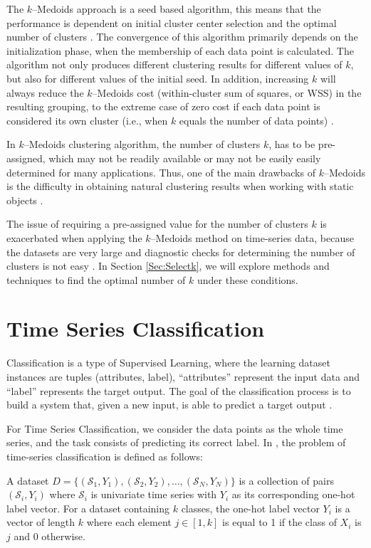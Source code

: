 The $k$--Medoids approach is a seed based algorithm, this means that the performance is dependent on initial cluster center selection and the optimal number of clusters \cite{Chowdhury2019}. The convergence of this algorithm primarily depends on the initialization phase, when the membership of each data point is calculated. The algorithm not only produces different clustering results for different values of $k$, but also for different values of the initial seed. In addition, increasing $k$ will always reduce the $k$--Medoids cost (within-cluster sum of squares, or WSS) in the resulting grouping, to the extreme case of zero cost if each data point is considered its own cluster (i.e., when $k$ equals the number of data points) \cite{HastieTF2009}. 

In $k$--Medoids clustering algorithm, the number of clusters $k$, has to be pre-assigned, which may not be readily available or may not be easily easily determined for many applications. Thus, one of the main drawbacks of $k$--Medoids is the difficulty in obtaining natural clustering results when working with static objects \cite{Mohri2012}.

The issue of requiring a pre-assigned value for the number of clusters $k$ is exacerbated when applying the $k$--Medoids method on time-series data, because the datasets are very large and diagnostic checks for determining the number of clusters is not easy \cite{Aghabozorgi2015}. In Section \ref{Sec:Selectk}, we will explore methods and techniques to find the optimal number of $k$ under these conditions.

\section{Time Series Classification} 
\label{Sec:TimeSeriesClassification}

Classification is a type of Supervised Learning, where the learning dataset instances are tuples (attributes, label), ``attributes'' represent the input data and ``label'' represents the target output. The goal of the classification process is to build a system that, given a new input, is able to predict a target output \cite{Mohri2012}. 

For Time Series Classification, we consider the data points as the whole time series, and the task consists of predicting its correct label. In \cite{Fawaz2019}, the problem of time-series classification is defined as follows: 

\begin{definition}
A dataset $D=\{(\mathcal{S}_1,Y_1),(\mathcal{S}_2,Y_2), \ldots ,(\mathcal{S}_N,Y_N)\}$ is a collection of pairs $(\mathcal{S}_i,Y_i)$ where $\mathcal{S}_i$ is univariate time series with $Y_i$ as its corresponding one-hot label vector.  For a dataset containing $k$ classes, the one-hot label vector $Y_i$ is a vector of length $k$ where each element $j \in [1,k]$ is equal to 1 if the class of $X_i$ is $j$ and $0$ otherwise.
\end{definition}

